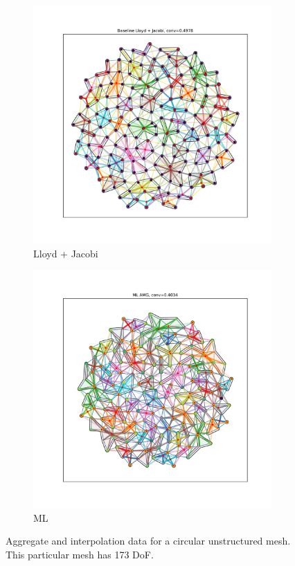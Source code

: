 \documentclass{article}
\begin{document}
\begin{figure}[h]
  \centering
  \begin{subfigure}[t]{0.49\textwidth}
    \centering
    \includegraphics[width=\textwidth, trim=80 70 70 50, clip]{grid_circle_lloyd.pdf}
    \caption{Lloyd + Jacobi}
  \end{subfigure}
  \begin{subfigure}[t]{0.49\textwidth}
    \centering
    \includegraphics[width=\textwidth, trim=80 70 70 50, clip]{grid_circle_ml.pdf}
    \caption{ML}
  \end{subfigure}
  \caption{Aggregate and interpolation data for a circular unstructured mesh.  This particular mesh has 173 DoF.}
  \label{fig:gridcircle}
\end{figure}
\end{document}

